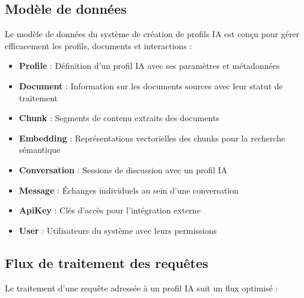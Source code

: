 \subsection{Modèle de données}

Le modèle de données du système de création de profils IA est conçu pour gérer efficacement les profils, documents et interactions :

\begin{itemize}
  \item \textbf{Profile} : Définition d'un profil IA avec ses paramètres et métadonnées
  
  \item \textbf{Document} : Information sur les documents sources avec leur statut de traitement
  
  \item \textbf{Chunk} : Segments de contenu extraits des documents
  
  \item \textbf{Embedding} : Représentations vectorielles des chunks pour la recherche sémantique
  
  \item \textbf{Conversation} : Sessions de discussion avec un profil IA
  
  \item \textbf{Message} : Échanges individuels au sein d'une conversation
  
  \item \textbf{ApiKey} : Clés d'accès pour l'intégration externe
  
  \item \textbf{User} : Utilisateurs du système avec leurs permissions
\end{itemize}

\subsection{Flux de traitement des requêtes}

Le traitement d'une requête adressée à un profil IA suit un flux optimisé :

